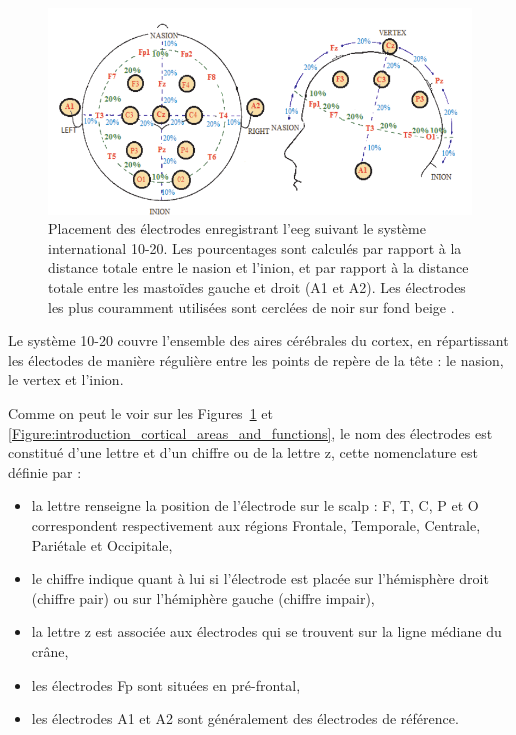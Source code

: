 \begin{figure}[h!]
  \centering
	\includegraphics[width=1\linewidth]{figures/chapter-1/introduction-system-10-20} 
  \caption{Placement des électrodes enregistrant l'\gls{eeg} suivant le système international 10-20. Les pourcentages sont calculés par rapport à la distance totale entre le nasion
	et l'inion, et par rapport à la distance totale entre les mastoïdes gauche et droit (A1 et A2). Les électrodes les plus couramment utilisées 
	sont cerclées de noir sur fond beige \citep{Marzbani2016}.}
  \label{Figure:introduction_system_10_20}
\end{figure}

Le système 10-20 couvre l'ensemble des aires cérébrales du cortex, en répartissant les électodes de manière régulière entre les points de repère de la tête : le nasion, le vertex et l'inion. 

Comme on peut le voir sur les Figures~\ref{Figure:introduction_system_10_20} et \ref{Figure:introduction_cortical_areas_and_functions}, le nom des électrodes est 
constitué d'une lettre et d'un chiffre ou de la lettre z, cette nomenclature est définie par \citet{Jasper1949} :
\begin{itemize}
\item la lettre renseigne la position de l'électrode sur le scalp : F, T, C, P et O correspondent respectivement aux régions Frontale, Temporale, Centrale, Pariétale et Occipitale,
\item le chiffre indique quant à lui si l'électrode est placée sur l'hémisphère droit (chiffre pair) ou sur l'hémiphère gauche (chiffre impair),
\item la lettre z est associée aux électrodes qui se trouvent sur la ligne médiane du crâne,
\item les électrodes Fp sont situées en pré-frontal,
\item les électrodes A1 et A2 sont généralement des électrodes de référence.
\end{itemize}
  
